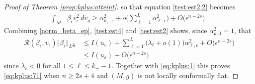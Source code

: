 \documentclass[10pt]{amsart}
\numberwithin{equation}{section}
\def\be{{\beta}}
\def\ep{{\varepsilon}}
\newcommand{\ve}{\varepsilon}
\def \ep{\epsilon}
\theoremstyle{plain}
\theoremstyle{remark}
\begin{document}
\begin{proof}[Proof of Theorem \ref{prop:kplus:atteint}]
so that %
 equation \eqref{test:est2:2} becomes %
\begin{equation} \label{test:est2}
\begin{aligned}
	\int_{M}& \be_\ep v_{\ep}^2\, dv_g  \ge \alpha_{k_+, \ep}^2 + o \Big( \sum_{\ell=1}^{L} \alpha_{\ell,\ep}^2 \Big) + O\big( \ep^{n-2s} \big).
\end{aligned} 
\end{equation}
Combining \eqref{norm_beta_ep}, \eqref{test:est4} and \eqref{test:est2} shows, since $\alpha_{k,0}^2=1$, that 
$$ \begin{aligned}
\mathcal{R}(\beta_\ep, v_\ep)  \Vert \beta_\ep \Vert_{L^{\frac{n}{2s}}} & \le I(u_\ve)  + \sum_{\ell=1}^{L} \big( \lambda_\ell + o(1) \big) \alpha_{\ell,\ep}^2 + O\big( \ep^{n-2s} \big)\\
& \le I(u_\ve)   + O\big( \ep^{n-2s} \big) 
\end{aligned} $$ 
since $\lambda_{\ell}<0$ for all $1 \le \ell \le k_+-1$. Together with \eqref{eq:kplus:1}  this proves \eqref{eq:kplus:71} when $n \ge 2s+4$ and $(M,g)$ is not locally conformally flat.

\medskip


\end{proof}
\end{document}
